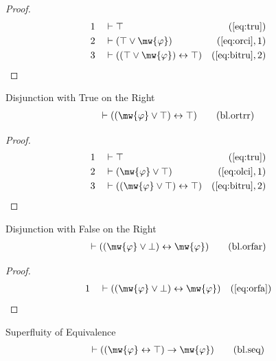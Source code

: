 \begin{proof}
\begin{align}
  1 &&  & \vdash \top&(\mbox{\ref{eq:tru}})\notag
  \\ 2 &&  & \vdash ( \top \vee \mw{\varphi} )&(\mbox{\ref{eq:orci}},1)\notag
  \\ 3 &&  & \vdash ( ( \top \vee \mw{\varphi} ) \leftrightarrow \top )&(\mbox{\ref{eq:bitru}},2)\notag
\end{align}
\end{proof}

\begin{lemma} Disjunction with True on the Right
\begin{align}
\vdash ( ( \mw{\varphi} \vee \top ) \leftrightarrow \top
    )\label{eq:bl.ortrr}\tag{bl.ortrr}
\end{align}
\end{lemma}

\begin{proof}
\begin{align}
  1 &&  & \vdash \top&(\mbox{\ref{eq:tru}})\notag
  \\ 2 &&  & \vdash ( \mw{\varphi} \vee \top )&(\mbox{\ref{eq:olci}},1)\notag
  \\ 3 &&  & \vdash ( ( \mw{\varphi} \vee \top ) \leftrightarrow \top )&(\mbox{\ref{eq:bitru}},2)\notag
\end{align}
\end{proof}

\begin{lemma} Disjunction with False on the Right
\begin{align}
\vdash ( ( \mw{\varphi} \vee \bot ) \leftrightarrow \mw{\varphi}
    )\label{eq:bl.orfar}\tag{bl.orfar}
\end{align}
\end{lemma}

\begin{proof}
\begin{align}
  1 &&  & \vdash ( ( \mw{\varphi} \vee \bot ) \leftrightarrow \mw{\varphi} )&(\mbox{\ref{eq:orfa}})\notag
\end{align}
\end{proof}

\begin{lemma} Superfluity of Equivalence
\begin{align}
\vdash ( ( \mw{\varphi} \leftrightarrow \top ) \rightarrow \mw{\varphi}
    )\label{eq:bl.seq}\tag{bl.seq}
\end{align}
\end{lemma}


